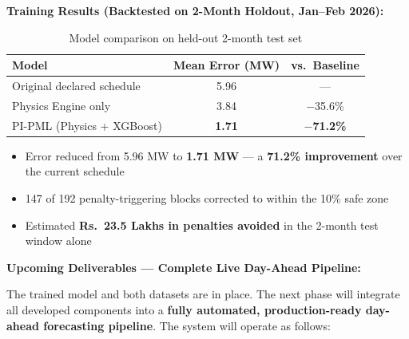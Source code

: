 \documentclass[11pt,a4paper]{article}
\begin{document}
\textbf{Training Results (Backtested on 2-Month Holdout, Jan--Feb 2026):}

\begin{table}[h!]
\centering
\small
\begin{tabular}{@{} l c c @{}}
    \toprule
    \textbf{Model} & \textbf{Mean Error (MW)} & \textbf{vs.\ Baseline} \\
    \midrule
    Original declared schedule    & 5.96 & --- \\
    Physics Engine only           & 3.84 & $-$35.6\% \\
    PI-PML (Physics + XGBoost)    & \textbf{1.71} & \textbf{$-$71.2\%} \\
    \bottomrule
\end{tabular}
\caption{Model comparison on held-out 2-month test set}
\end{table}

\begin{itemize}
    \item Error reduced from 5.96 MW to \textbf{1.71 MW} --- a \textbf{71.2\% improvement} over the current schedule
    \item 147 of 192 penalty-triggering blocks corrected to within the 10\% safe zone
    \item Estimated \textbf{Rs.\ 23.5 Lakhs in penalties avoided} in the 2-month test window alone
\end{itemize}

\textbf{Upcoming Deliverables --- Complete Live Day-Ahead Pipeline:}

The trained model and both datasets are in place. The next phase will integrate all developed components into a \textbf{fully automated, production-ready day-ahead forecasting pipeline}. The system will operate as follows:
\end{document}
